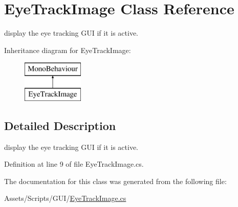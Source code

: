 \hypertarget{class_eye_track_image}{}\section{Eye\+Track\+Image Class Reference}
\label{class_eye_track_image}


display the eye tracking G\+UI if it is active.  


Inheritance diagram for Eye\+Track\+Image\+:\begin{figure}[H]
\begin{center}
\leavevmode
\includegraphics[height=2.000000cm]{class_eye_track_image}
\end{center}
\end{figure}


\subsection{Detailed Description}
display the eye tracking G\+UI if it is active. 



Definition at line 9 of file Eye\+Track\+Image.\+cs.



The documentation for this class was generated from the following file\+:\begin{DoxyCompactItemize}
\item 
Assets/\+Scripts/\+G\+U\+I/\mbox{\hyperlink{_eye_track_image_8cs}{Eye\+Track\+Image.\+cs}}\end{DoxyCompactItemize}
